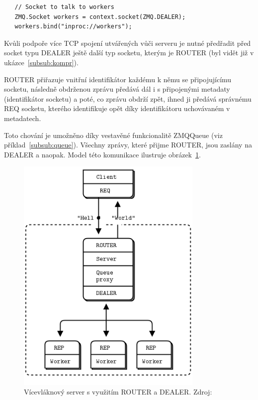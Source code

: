 \documentclass[thesis=M,czech]{FITthesis}[2014/05/07]
\begin{document}
\begin{verbatim}
   // Socket to talk to workers
   ZMQ.Socket workers = context.socket(ZMQ.DEALER);
   workers.bind("inproc://workers");
\end{verbatim}

Kvůli podpoře více TCP spojení utvářených vůči serveru je nutné předřadit před socket typu DEALER ještě další typ socketu, kterým je ROUTER (byl vidět již v ukázce~\ref{subsub:kompr}). 

ROUTER přiřazuje vnitřní identifikátor každému k němu se připojujícímu socketu, následně obdrženou zprávu předává dál i s připojenými metadaty (identifikátor socketu) a poté, co zprávu obdrží zpět, ihned ji předává správnému REQ socketu, kterého identifikuje opět díky identifikátoru uchovávaném v metadatech.

Toto chování je umožněno díky vestavěné funkcionalitě ZMQQueue (viz příklad~\ref{subsub:queue}). Všechny zprávy, které přijme ROUTER, jsou zaslány na DEALER a naopak. Model této komunikace ilustruje obrázek~\ref{fig:mtserver}.

\begin{figure}\centering
	\includegraphics[width=0.8\textwidth]{obr/multithreadingServer.png}
 	\caption[Vícevláknový server s využitím ROUTER a DEALER.]{Vícevláknový server s využitím ROUTER a DEALER. Zdroj: \cite{mtserver}}\label{fig:mtserver}
\end{figure}	
\end{document}
